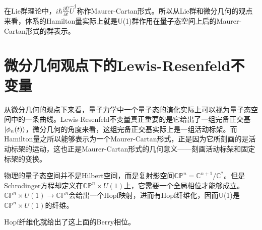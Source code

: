 \documentclass[a4paper]{article}
\begin{document}
        在Lie群理论中，$i\hbar\frac{\partial\hat{U}}{\partial t}\hat{U}^\dagger$称作Maurer-Cartan形式。所以从Lie群和微分几何的观点来看，体系的Hamilton量实际上就是U(1)群作用在量子态空间上后的Maurer-Cartan形式的群表示。



    \section{微分几何观点下的Lewis-Resenfeld不变量}

        从微分几何的观点下来看，量子力学中一个量子态的演化实际上可以视为量子态空间中的一条曲线。Lewis-Resenfeld不变量真正重要的是它给出了一组完备正交基$\ket{\phi_n(t)}$，微分几何的角度来看，这组完备正交基实际上是一组活动标架。而Hamilton量之所以能够表示为一个Maurer-Cartan形式，正是因为它所刻画的是活动标架的运动，这也正是Maurer-Cartan形式的几何意义——刻画活动标架和固定标架的变换。
        
        物理的量子态空间并不是Hilbert空间，而是复射影空间$\mathbb{CP}^n=\mathbb{C}^{n+1}/\mathbb{C}^*$。但是Schrodinger方程却定义在$\mathbb{CP}^n\times U(1)$上，它需要一个全局相位才能够成立。$\mathbb{CP}^n\times U(1)\to\mathbb{CP}^n$会给出一个Hopf映射，进而有Hopf纤维化，因而U(1)是$\mathbb{CP}^n\times U(1)$的纤维。
        
        
        Hopf纤维化就给出了这上面的Berry相位。
\end{document}
